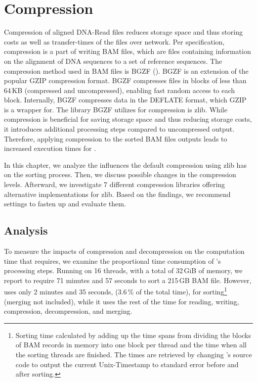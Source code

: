 \section{Compression}\label{compression}
Compression of aligned DNA-Read files reduces storage space and thus storing costs as well as transfer-times of the files over network. Per specification, compression is a part of writing BAM files, which are files containing information on the alignment of DNA sequences to a set of reference sequences. The compression method used in BAM files is BGZF (). BGZF is an extension of the popular GZIP compression format. BGZF compresses files in blocks of less than 64\,KB (compressed and uncompressed), enabling fast random access to each block. Internally, BGZF compresses data in the DEFLATE format, which GZIP is a wrapper for. The library BGZF utilizes for compression is zlib.
While compression is beneficial for saving storage space and thus reducing storage costs, it introduces additional processing steps compared to uncompressed output. Therefore, applying compression to the sorted BAM files \sort outputs leads to increased execution times for \sort.

In this chapter, we analyze the influences the default compression using zlib has on the sorting process. Then, we discuss possible changes in the compression levels. Afterward, we investigate 7 different compression libraries offering alternative implementations for zlib. Based on the findings, we recommend settings to fasten up \sort and evaluate them.

\subsection{Analysis}
To measure the impacts of compression and decompression on the computation time that \sort requires, we examine the proportional time consumption of \sort's processing steps. 
Running on 16 threads, with a total of 32\,GiB of memory, we report \sort to require 71 minutes and 57 seconds to sort a 215\,GB BAM file. However, \sort uses only 2 minutes and 35 seconds, (3.6\,\% of the total time), for sorting\footnote{Sorting time calculated by adding up the time spans from dividing the blocks of BAM records in memory into one block per thread and the time when all the sorting threads are finished. The times are retrieved by changing \sort's source code to output the current Unix-Timestamp to standard error before and after sorting.} (merging not included), while it uses the rest of the time for reading, writing, compression, decompression, and merging.

